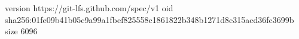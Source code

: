 version https://git-lfs.github.com/spec/v1
oid sha256:01fe09b41b05c9a99a1fbef825558c1861822b348b1271d8c315acd36fc3699b
size 6096

